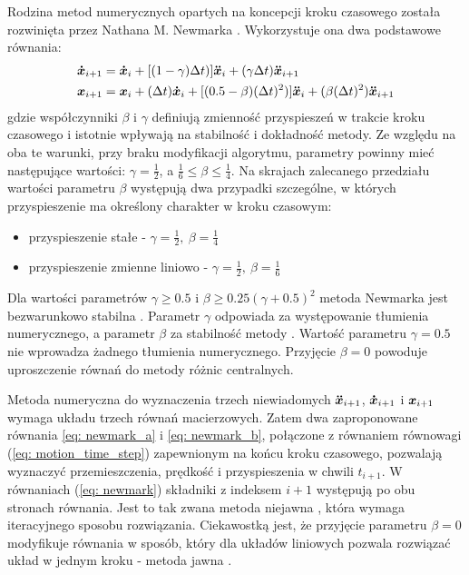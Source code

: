 Rodzina metod numerycznych opartych na koncepcji kroku czasowego została rozwinięta przez Nathana M. Newmarka \parencite{Newmark1959}. Wykorzystuje ona dwa podstawowe równania:
\begin{subequations} \label{eq: newmark}
	\begin{align}
		\bm{\dot{x}}_{i+1} &= \bm{\dot{x}}_{i} + [(1-\gamma)\Delta t)]\bm{\ddot{x}}_{i} + (\gamma\Delta t)\bm{\ddot{x}}_{i+1} 
		\label{eq: newmark_a}\\
		\bm{x}_{i+1} &= \bm{x}_{i} + (\Delta t)\bm{\dot{x}}_{i} + [(0.5-\beta)(\Delta t)^2)]\bm{\ddot{x}}_{i}+ (\beta(\Delta t)^2)\bm{\ddot{x}}_{i+1} 
		\label{eq: newmark_b}
	\end{align}
\end{subequations}
gdzie współczynniki $\beta$ i $\gamma$ definiują zmienność przyspieszeń w trakcie kroku czasowego i istotnie wpływają na stabilność i dokładność metody. Ze względu na oba te warunki, przy braku modyfikacji algorytmu, parametry powinny mieć następujące wartości: $\gamma = \frac{1}{2}$, a $ \frac{1}{6}\leq \beta \leq \frac{1}{4}$. Na skrajach zalecanego przedziału wartości parametru $\beta$ występują dwa przypadki szczególne, w których przyspieszenie ma określony charakter w kroku czasowym:
\begin{itemize}
	\item przyspieszenie stałe - $\gamma = \frac{1}{2},\: \beta = \frac{1}{4}$
	\item przyspieszenie zmienne liniowo - $\gamma = \frac{1}{2},\: \beta = \frac{1}{6}$
\end{itemize}

Dla wartości parametrów $\gamma\ge 0.5$ i $\beta\ge0.25(\gamma+0.5)^2$ metoda Newmarka jest bezwarunkowo stabilna \parencite{Rakowski2016}. Parametr $\gamma$ odpowiada za występowanie tłumienia numerycznego, a parametr $\beta$ za stabilność metody \parencite{Bajer2012}. Wartość parametru $\gamma=0.5$ nie wprowadza żadnego tłumienia numerycznego. Przyjęcie $\beta=0$ powoduje uproszczenie równań do metody różnic centralnych.

Metoda numeryczna do wyznaczenia trzech niewiadomych $\bm{\ddot{x}}_{i+1}$, $\bm{\dot{x}}_{i+1}$ i $\bm{x}_{i+1}$ wymaga układu trzech równań macierzowych. Zatem dwa zaproponowane równania \ref{eq: newmark_a} i \ref{eq: newmark_b}, połączone z równaniem równowagi (\ref{eq: motion_time_step}) zapewnionym na końcu kroku czasowego, pozwalają wyznaczyć przemieszczenia, prędkość i przyspieszenia w chwili $t_{i+1}$. W równaniach (\ref{eq: newmark}) składniki z indeksem $i+1$ występują po obu stronach równania. Jest to tak zwana metoda niejawna , która wymaga iteracyjnego sposobu rozwiązania. Ciekawostką jest, że przyjęcie parametru $\beta=0$ modyfikuje równania w sposób, który dla układów liniowych pozwala rozwiązać układ w jednym kroku - metoda jawna . 

